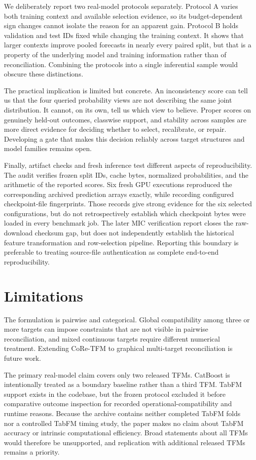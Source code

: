 \documentclass[a4paper,fleqn]{cas-sc}
\begin{document}
We deliberately report two real-model protocols separately. Protocol A varies both training context and available selection evidence, so its budget-dependent sign changes cannot isolate the reason for an apparent gain. Protocol B holds validation and test IDs fixed while changing the training context. It shows that larger contexts improve pooled forecasts in nearly every paired split, but that is a property of the underlying model and training information rather than of reconciliation. Combining the protocols into a single inferential sample would obscure these distinctions.

The practical implication is limited but concrete. An inconsistency score can tell us that the four queried probability views are not describing the same joint distribution. It cannot, on its own, tell us which view to believe. Proper scores on genuinely held-out outcomes, classwise support, and stability across samples are more direct evidence for deciding whether to select, recalibrate, or repair. Developing a gate that makes this decision reliably across target structures and model families remains open.

Finally, artifact checks and fresh inference test different aspects of reproducibility. The audit verifies frozen split IDs, cache bytes, normalized probabilities, and the arithmetic of the reported scores. Six fresh GPU executions reproduced the corresponding archived prediction arrays exactly, while recording configured checkpoint-file fingerprints. Those records give strong evidence for the six selected configurations, but do not retrospectively establish which checkpoint bytes were loaded in every benchmark job. The later MIC verification report closes the raw-download checksum gap, but does not independently establish the historical feature transformation and row-selection pipeline. Reporting this boundary is preferable to treating source-file authentication as complete end-to-end reproducibility.

\section{Limitations}
The formulation is pairwise and categorical. Global compatibility among three or more targets can impose constraints that are not visible in pairwise reconciliation, and mixed continuous targets require different numerical treatment. Extending CoRe-TFM to graphical multi-target reconciliation is future work.

The primary real-model claim covers only two released TFMs. CatBoost is intentionally treated as a boundary baseline rather than a third TFM. TabFM support exists in the codebase, but the frozen protocol excluded it before comparative outcome inspection for recorded operational-compatibility and runtime reasons. Because the archive contains neither completed TabFM folds nor a controlled TabFM timing study, the paper makes no claim about TabFM accuracy or intrinsic computational efficiency. Broad statements about all TFMs would therefore be unsupported, and replication with additional released TFMs remains a priority.
\end{document}
